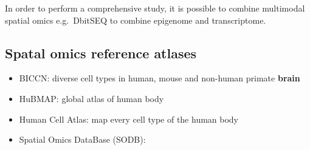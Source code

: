In order to perform a comprehensive study, it is possible to combine
multimodal spatial omics e.g.~DbitSEQ to combine epigenome and
transcriptome.

\hypertarget{spatal-omics-reference-atlases}{%
\subsection{Spatal omics reference
atlases}\label{spatal-omics-reference-atlases}}

\begin{itemize}
\tightlist
\item
  BICCN: diverse cell types in human, mouse and non-human primate
  \textbf{brain}
\item
  HuBMAP: global atlas of human body
\item
  Human Cell Atlas: map every cell type of the human body
\item
  Spatial Omics DataBase (SODB):
\end{itemize}
